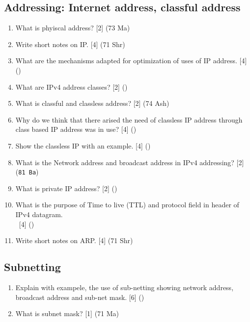 \documentclass[12pt]{article}
\newcommand{\enter}{\\\textcolor{white}{1}}
\begin{document}
	\subsection{Addressing: Internet address, classful address}
		\begin{enumerate}[noitemsep, topsep=0pt]
			\item What is phyiscal address? \hfill [2] (73 Ma)

			\item Write short notes on IP. \hfill [4] (71 Shr)

			\item What are the mechanisms adapted for optimization of uses of IP address. \hfill [4] ()

			\item What are IPv4 address classes? \hfill [2] ()

			\item What is classful and classless address? \hfill [2] (74 Ash)

			\item Why do we think that there arised the need of classless IP address through class based IP address was in use? \hfill [4] ()

			\item Show the classless IP with an example. \hfill [4] ()

			\item What is the Network address and broadcast address in IPv4 addressing? \hfill [2] (\texttt{81 Ba})

			\item What is private IP address? \hfill [2] ()

			\item What is the purpose of Time to live (TTL) and protocol field in header of IPv4 datagram.
			\enter\hfill [4] ()

			\item Write short notes on ARP. \hfill [4] (71 Shr)
		\end{enumerate}

	\subsection{Subnetting}
		\begin{enumerate}
			\item Explain with exampele, the use of sub-netting showing network address, broadcast address and sub-net mask. \hfill [6] ()

			\item What is subnet mask? \hfill [1] (71 Ma)
		\end{enumerate}
\end{document}
